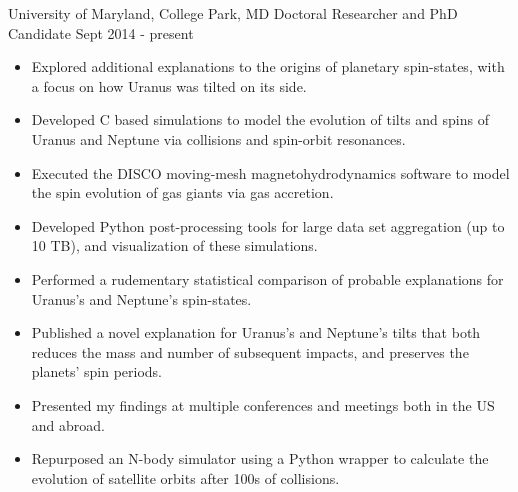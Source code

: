 \documentclass[]{awesome-cv}
\begin{document}
\vspace{-10mm}

\begin{cventries}
		\cventry
		{University of Maryland, College Park, MD}
		{Doctoral Researcher and PhD Candidate}
		{Sept 2014 - present}
		{}
		{\vspace{-3mm}
			\begin{itemize}
				\item Explored additional explanations to the origins of planetary spin-states, with a focus on how Uranus was tilted on its side. \vspace{0.7mm}
				\item Developed C based simulations to model the evolution of tilts and spins of Uranus and Neptune via collisions and spin-orbit resonances. \vspace{0.7mm}
				\item Executed the DISCO moving-mesh magnetohydrodynamics software to model the spin evolution of gas giants via gas accretion. \vspace{0.7mm} 
				\item Developed Python post-processing tools for large data set aggregation (up to 10 TB), and visualization of these simulations. \vspace{0.7mm}
				\item Performed a rudementary statistical comparison of probable explanations for Uranus's and Neptune's spin-states. \vspace{0.7mm}
				\item Published a novel explanation for Uranus's and Neptune's tilts that both reduces the mass and number of subsequent impacts, and preserves the planets' spin periods. \vspace{0.7mm}
				\item Presented my findings at multiple conferences and meetings both in the US and abroad. \vspace{0.7mm}
				\item Repurposed an N-body simulator using a Python wrapper to calculate the evolution of satellite orbits after 100s of collisions. \vspace{0.7mm}
			\end{itemize}
		}
	

\end{cventries}
\end{document}
